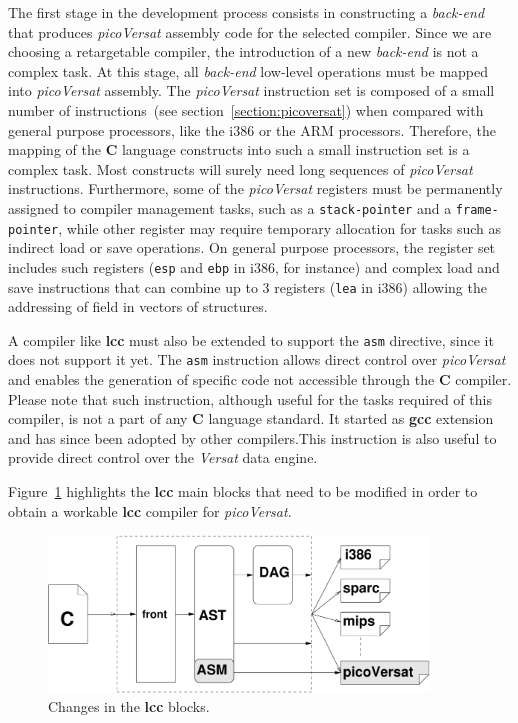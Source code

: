 The first stage in the development process consists in constructing a {\it back-end}
that produces {\it picoVersat} assembly code for the selected compiler.  Since
we are choosing a retargetable compiler, the introduction of a new {\it back-end} is
not a complex task.  At this stage, all {\it back-end} low-level operations must be
mapped into {\it picoVersat} assembly.  The {\it picoVersat} instruction set is
composed of a small number of instructions~(see
section~\ref{section:picoversat}) when compared with general purpose processors,
like the {\sc i386} or the {\sc ARM} processors.  Therefore, the mapping of the
{\bf C} language constructs into such a small instruction set is a complex task.
Most constructs will surely need long sequences of {\it picoVersat}
instructions.  Furthermore, some of the {\it picoVersat} registers must be
permanently assigned to compiler management tasks, such as a {\tt stack-pointer}
and a {\tt frame-pointer}, while other register may require temporary allocation
for tasks such as indirect load or save operations.  On general purpose
processors, the register set includes such registers ({\tt esp} and {\tt ebp} in
{\sc i386}, for instance) and complex load and save instructions that can
combine up to 3 registers ({\tt lea} in {\sc i386}) allowing the addressing of
field in vectors of structures.

A compiler like {\bf lcc} must also be extended to support the {\tt asm}
directive, since it does not support it yet.
The {\tt asm} instruction  allows direct control over {\it picoVersat} and
enables the generation of specific code not accessible through the {\bf C}
compiler.  Please note that such instruction,
although useful for the tasks required of this compiler, is not a part of any
{\bf C} language standard.  It started as {\bf gcc} extension and has since been
adopted by other compilers.This instruction is also useful to provide direct
control over the {\it Versat} data engine.

Figure~\ref{fig:lccPico} highlights the {\bf lcc} main blocks that need to be
modified in order to obtain a workable {\bf lcc} compiler for {\it picoVersat}.

\begin{figure}[!htbp]
    \centerline{\includegraphics[width=0.9\textwidth]{Figures/lccPico.pdf}}
    \vspace{0cm}\caption{Changes in the {\bf lcc} blocks.}
    \label{fig:lccPico}
\end{figure}

